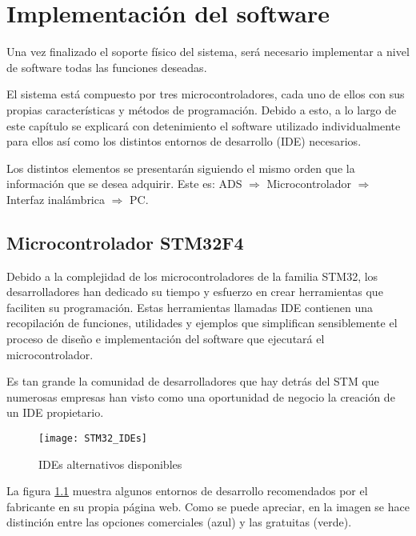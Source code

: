 \chapter{Implementación del software\label{sec:Implementacion_soft}}

Una vez finalizado el soporte físico del sistema, será necesario implementar a nivel de software todas las funciones deseadas.

El sistema está compuesto por tres microcontroladores, cada uno de ellos con sus propias características y métodos de programación. Debido a esto, a lo largo de este capítulo se explicará con detenimiento el software utilizado individualmente para ellos así como los distintos entornos de desarrollo (\acrshort{IDE}) necesarios.

Los distintos elementos se presentarán siguiendo el mismo orden que la información que se desea adquirir. Este es:
ADS $\Rightarrow$ Microcontrolador $\Rightarrow$ Interfaz inalámbrica $\Rightarrow$ PC.

\section{Microcontrolador STM32F4\label{sec:Software_micro}}

Debido a la complejidad de los microcontroladores de la familia STM32, los desarrolladores han dedicado su tiempo y esfuerzo en crear herramientas que faciliten su programación. Estas herramientas llamadas \acrshort{IDE} contienen una recopilación de funciones, utilidades y ejemplos que simplifican sensiblemente el proceso de diseño e implementación del software que ejecutará el microcontrolador.

Es tan grande la comunidad de desarrolladores que hay detrás del STM que numerosas empresas han visto como una oportunidad de negocio la creación de un \acrshort{IDE} propietario.

\clearpage

\begin{figure} [h]
    \centering
    \texttt{[image: STM32\_IDEs]}
    \caption{IDEs alternativos disponibles \cite{STM32_IDEs}}
    \label{fig:STM32_IDEs}
\end{figure}

La figura \ref{fig:STM32_IDEs} muestra algunos entornos de desarrollo recomendados por el fabricante en su propia página web. Como se puede apreciar, en la imagen se hace distinción entre las opciones comerciales (azul) y las gratuitas (verde).

